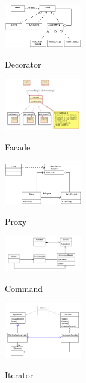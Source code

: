 \begin{figure}[h]
	\begin{center}
		\includegraphics[width=0.3\textwidth]{images/decorator}
		\label{fig:decorator}
		\caption{Decorator}
	\end{center}
\end{figure}

\begin{figure}[h]
	\begin{center}
		\includegraphics[width=0.3\textwidth]{images/facade}
		\label{fig:facade}
		\caption{Facade}
	\end{center}
\end{figure}

\begin{figure}[h]
	\begin{center}
		\includegraphics[width=0.3\textwidth]{images/proxy}
		\label{fig:proxy}
		\caption{Proxy}
	\end{center}
\end{figure}

\begin{figure}[h]
	\begin{center}
		\includegraphics[width=0.3\textwidth]{images/command}
		\label{fig:command}
		\caption{Command}
	\end{center}
\end{figure}

\begin{figure}[h]
	\begin{center}
		\includegraphics[width=0.3\textwidth]{images/iterator}
		\label{fig:iterator}
		\caption{Iterator}
	\end{center}
\end{figure}

